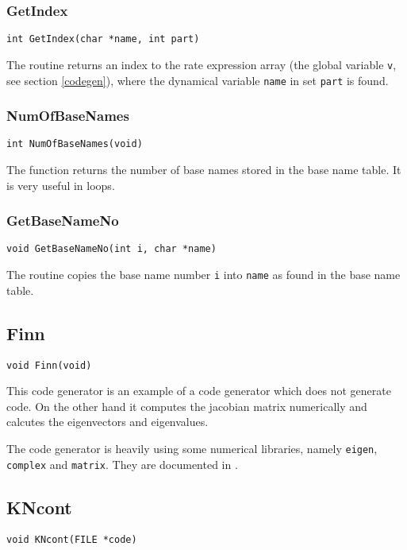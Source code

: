 \subsubsection{GetIndex}
\begin{verbatim}
int GetIndex(char *name, int part)
\end{verbatim}

The routine returns an index to the rate expression array (the global
variable {\tt v}, see section \ref{codegen}), where the dynamical
variable {\tt name} in set {\tt part} is found.

\subsubsection{NumOfBaseNames}
\begin{verbatim}
int NumOfBaseNames(void)
\end{verbatim}

The function returns the number of base names stored in the base name
table. It is very useful in loops.

\subsubsection{GetBaseNameNo}
\begin{verbatim}
void GetBaseNameNo(int i, char *name)
\end{verbatim}

The routine copies the base name number {\tt i} into {\tt name} as
found in the base name table.


\subsection{Finn}
\begin{verbatim}
void Finn(void)
\end{verbatim}

This code generator is an example of a code generator which does not
generate code. On the other hand it computes the jacobian matrix
numerically and calcutes the eigenvectors and eigenvalues.

The code generator is heavily using some numerical libraries, namely
{\tt eigen}, {\tt complex} and {\tt matrix}. They are documented in
\cite{kk:numlib94}. 


\subsection{KNcont}
\begin{verbatim}
void KNcont(FILE *code)
\end{verbatim}

